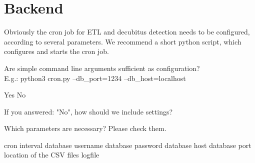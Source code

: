 \documentclass{exam}
\begin{document}
\section*{Backend}

Obviously the cron job for ETL and decubitus detection needs to be configured, according to several parameters. 
We recommend a short python script, which configures and starts the cron job. 


\begin{questions}

	\question Are simple command line arguments sufficient as configuration? \\E.g.: python3 cron.py --db\_port=1234 --db\_host=localhost

	\begin{checkboxes}
		\choice	Yes
		\choice	No
	\end{checkboxes}

	If you answered: "No", how should we include settings?

	\vspace{3cm}

	\question Which parameters are necessary? Please check them.

	\begin{checkboxes}
		\choice cron interval
		\choice database username
		\choice database password
		\choice database host
		\choice database port
		\choice location of the CSV files
		\choice logfile
	\end{checkboxes}
\end{questions}
\end{document}
